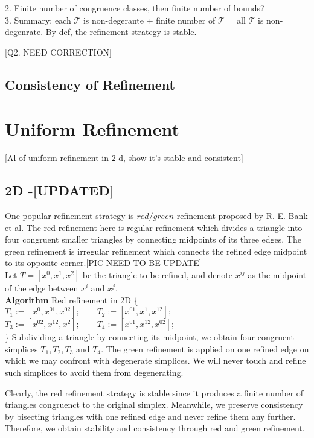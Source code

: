 \documentclass{article}
\begin{document}
    
    2. Finite number of congruence classes, then finite number of bounds?\\
    3. Summary: each $\mathcal{T}$ is non-degerante + finite number of $\mathcal{T}$ = all $\mathcal{T}$ is non-degenrate. By def, the refinement strategy is stable.

    [Q2. NEED CORRECTION]
    
    \subsection{Consistency of Refinement}

    \section{Uniform Refinement}
    [Al of uniform refinement in 2-d, show it's stable and consistent]
    \subsection{2D -[UPDATED]}
    One popular refinement strategy is $red/green$ refinement proposed by R. E. Bank et al. The red refinement here is regular refinement which divides a triangle into four congruent smaller triangles by connecting midpoints of its three edges. The green refinement is irregular refinement which connects the refined edge midpoint to its opposite corner.[PIC-NEED TO BE UPDATE]\\

    Let $T = [x^0, x^1, x^2]$ be the triangle to be refined, and denote $x^{ij}$ as the midpoint of the edge between $x^i$ and $x^j$.\\
    \textbf{Algorithm} Red refinement in 2D \{\\
    $T_1 := [x^0, x^{01}, x^{02}]; \qquad T_2 := [x^{01}, x^{1}, x^{12}];$\\
    $T_3 := [x^{02}, x^{12}, x^2]; \qquad T_4 := [x^{01}, x^{12}, x^{02}];$\\
    \}
    Subdividing a triangle by connecting its midpoint, we obtain four congruent simplices $T_1, T_2, T_3$ and $T_4$. The green refinement is applied on one refined edge on which we may confront with degenerate simplices. We will never touch and refine such simplices to avoid them from degenerating.

    
    Clearly, the red refinement strategy is stable since it produces a finite number of triangles congruenct to the original simplex. Meanwhile, we preserve consistency by bisecting triangles with one refined edge and never refine them any further. Therefore, we obtain stability and consistency through red and green refinement.
\end{document}
